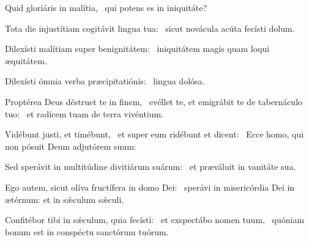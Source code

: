 \item Quid gloriáris in malítia,~\psstar{} qui potens es in iniquitáte?

\item Tota die injustítiam cogitávit lingua tua:~\psstar{} sicut novácula acúta fecísti dolum.

\item Dilexísti malítiam super benignitátem:~\psstar{} iniquitátem magis quam loqui æquitátem.

\item Dilexísti ómnia verba præcipitatiónis:~\psstar{} lingua dolósa.

\item Proptérea Deus déstruet te in finem,~\pscross{} evéllet te, et emigrábit te de tabernáculo tuo:~\psstar{} et radícem tuam de terra vivéntium.

\item Vidébunt justi, et timébunt,~\pscross{} et super eum ridébunt et dicent:~\psstar{} Ecce homo, qui non pósuit Deum adjutórem suum:

\item Sed sperávit in multitúdine divitiárum suárum:~\psstar{} et præváluit in vanitáte sua.

\item Ego autem, sicut olíva fructífera in domo Dei:~\psstar{} sperávi in misericórdia Dei in ætérnum: et in sǽculum sǽculi.

\item Confitébor tibi in sǽculum, quia fecísti:~\pscross{} et exspectábo nomen tuum,~\psstar{} quóniam bonum est in conspéctu sanctórum tuórum.